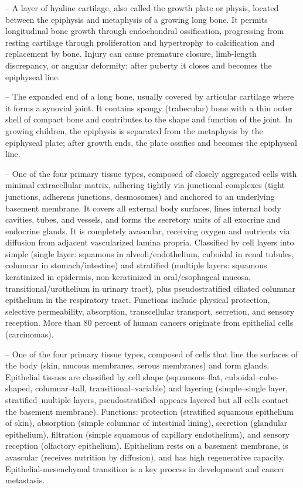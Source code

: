 -- A layer of hyaline cartilage, also called the growth plate or physis, located between the epiphysis and metaphysis of a growing long bone. It permits longitudinal bone growth through endochondral ossification, progressing from resting cartilage through proliferation and hypertrophy to calcification and replacement by bone. Injury can cause premature closure, limb-length discrepancy, or angular deformity; after puberty it closes and becomes the epiphyseal line.

-- The expanded end of a long bone, usually covered by articular cartilage where it forms a synovial joint. It contains spongy (trabecular) bone with a thin outer shell of compact bone and contributes to the shape and function of the joint. In growing children, the epiphysis is separated from the metaphysis by the epiphyseal plate; after growth ends, the plate ossifies and becomes the epiphyseal line.

-- One of the four primary tissue types, composed of closely aggregated cells with minimal extracellular matrix, adhering tightly via junctional complexes (tight junctions, adherens junctions, desmosomes) and anchored to an underlying basement membrane. It covers all external body surfaces, lines internal body cavities, tubes, and vessels, and forms the secretory units of all exocrine and endocrine glands. It is completely avascular, receiving oxygen and nutrients via diffusion from adjacent vascularized lamina propria. Classified by cell layers into simple (single layer: squamous in alveoli/endothelium, cuboidal in renal tubules, columnar in stomach/intestine) and stratified (multiple layers: squamous keratinized in epidermis, non-keratinized in oral/esophageal mucosa, transitional/urothelium in urinary tract), plus pseudostratified ciliated columnar epithelium in the respiratory tract. Functions include physical protection, selective permeability, absorption, transcellular transport, secretion, and sensory reception. More than 80 percent of human cancers originate from epithelial cells (carcinomas).

-- One of the four primary tissue types, composed of cells that line the surfaces of the body (skin, mucous membranes, serous membranes) and form glands. Epithelial tissues are classified by cell shape (squamous--flat, cuboidal--cube-shaped, columnar--tall, transitional--variable) and layering (simple--single layer, stratified--multiple layers, pseudostratified--appears layered but all cells contact the basement membrane). Functions: protection (stratified squamous epithelium of skin), absorption (simple columnar of intestinal lining), secretion (glandular epithelium), filtration (simple squamous of capillary endothelium), and sensory reception (olfactory epithelium). Epithelium rests on a basement membrane, is avascular (receives nutrition by diffusion), and has high regenerative capacity. Epithelial-mesenchymal transition is a key process in development and cancer metastasis.


